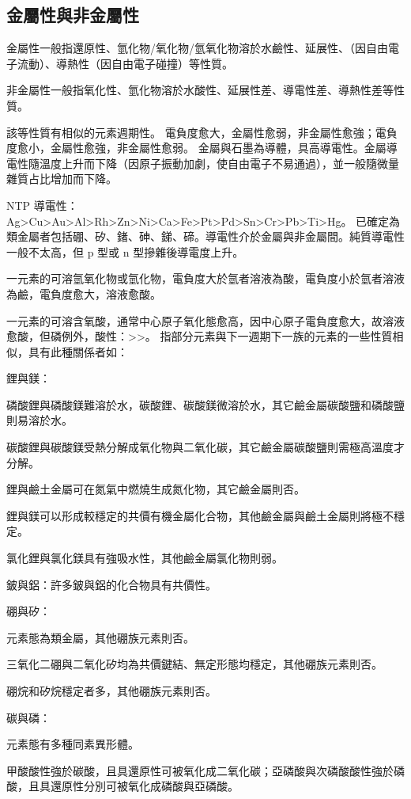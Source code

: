 \documentclass[a4paper,12pt]{report}
\begin{document}
\subsection{金屬性與非金屬性}
\bit
\item 金屬性一般指還原性、氫化物/氧化物/氫氧化物溶於水鹼性、延展性、（因自由電子流動）、導熱性（因自由電子碰撞）等性質。
\item 非金屬性一般指氧化性、氫化物溶於水酸性、延展性差、導電性差、導熱性差等性質。
\item 該等性質有相似的元素週期性。
\eit
{}
電負度愈大，金屬性愈弱，非金屬性愈強；電負度愈小，金屬性愈強，非金屬性愈弱。
金屬與石墨為導體，具高導電性。金屬導電性隨溫度上升而下降（因原子振動加劇，使自由電子不易通過），並一般隨微量雜質占比增加而下降。

NTP 導電性：Ag>Cu>Au>Al>Rh>Zn>Ni>Ca>Fe>Pt>Pd>Sn>Cr>Pb>Ti>Hg。
已確定為類金屬者包括硼、矽、鍺、砷、銻、碲。導電性介於金屬與非金屬間。純質導電性一般不太高，但 p 型或 n 型摻雜後導電度上升。
\bit
\item 一元素的可溶氫氧化物或氫化物，電負度大於氫者溶液為酸，電負度小於氫者溶液為鹼，電負度愈大，溶液愈酸。
\item 一元素的可溶含氧酸，通常中心原子氧化態愈高，因中心原子電負度愈大，故溶液愈酸，但磷例外，酸性：>>。
\eit
{}
指部分元素與下一週期下一族的元素的一些性質相似，具有此種關係者如：
\bit
\item 鋰與鎂：
\bit
\item 磷酸鋰與磷酸鎂難溶於水，碳酸鋰、碳酸鎂微溶於水，其它鹼金屬碳酸鹽和磷酸鹽則易溶於水。
\item 碳酸鋰與碳酸鎂受熱分解成氧化物與二氧化碳，其它鹼金屬碳酸鹽則需極高溫度才分解。
\item 鋰與鹼土金屬可在氮氣中燃燒生成氮化物，其它鹼金屬則否。
\item 鋰與鎂可以形成較穩定的共價有機金屬化合物，其他鹼金屬與鹼土金屬則將極不穩定。
\item 氯化鋰與氯化鎂具有強吸水性，其他鹼金屬氯化物則弱。
\eit
\item 鈹與鋁：許多鈹與鋁的化合物具有共價性。
\item 硼與矽：
\bit
\item 元素態為類金屬，其他硼族元素則否。
\item 三氧化二硼與二氧化矽均為共價鍵結、無定形態均穩定，其他硼族元素則否。
\item 硼烷和矽烷穩定者多，其他硼族元素則否。
\eit
\item 碳與磷：
\bit
\item 元素態有多種同素異形體。
\item 甲酸酸性強於碳酸，且具還原性可被氧化成二氧化碳；亞磷酸與次磷酸酸性強於磷酸，且具還原性分別可被氧化成磷酸與亞磷酸。
\eit
\eit
\end{document}
